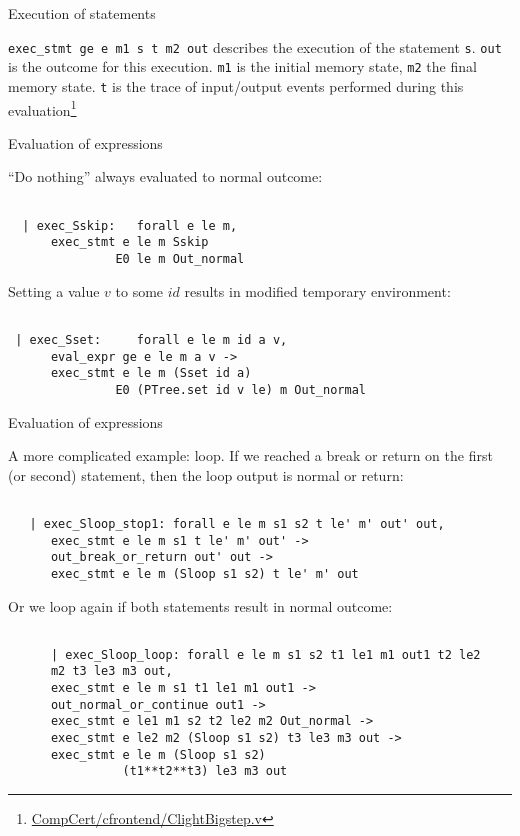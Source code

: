 \documentclass{beamer}
\begin{document}
\begin{frame}{Execution of statements}
  
     \texttt{exec\_stmt ge e m1 s t m2 out} describes the execution of
  the statement \texttt{s}.  \texttt{out} is the outcome for this execution.
  \texttt{m1} is the initial memory state, \texttt{m2} the final memory state.
  \texttt{t} is the trace of input/output events performed during this
  evaluation\footnote{\url{CompCert/cfrontend/ClightBigstep.v}}
\end{frame}

\begin{frame}[fragile]{Evaluation of expressions}

  ``Do nothing'' always evaluated to normal outcome: 

  \begin{lstlisting}[language=Coq]
   
  | exec_Sskip:   forall e le m,
      exec_stmt e le m Sskip
               E0 le m Out_normal
\end{lstlisting}

Setting a value $v$ to some $id$ results in modified temporary environment:
  
    \begin{lstlisting}[language=Coq]
   
 | exec_Sset:     forall e le m id a v,
      eval_expr ge e le m a v ->
      exec_stmt e le m (Sset id a)
               E0 (PTree.set id v le) m Out_normal
\end{lstlisting}
\end{frame}

\begin{frame}[fragile]{Evaluation of expressions}

  A more complicated example: loop. If we reached a break or return on the first (or second) statement, then the loop output is normal or return:
  
  \begin{lstlisting}[language=Coq]
   
   | exec_Sloop_stop1: forall e le m s1 s2 t le' m' out' out,
      exec_stmt e le m s1 t le' m' out' ->
      out_break_or_return out' out ->
      exec_stmt e le m (Sloop s1 s2) t le' m' out
\end{lstlisting}

Or we loop again if both statements result in normal outcome:
  
    \begin{lstlisting}[language=Coq]
   
      | exec_Sloop_loop: forall e le m s1 s2 t1 le1 m1 out1 t2 le2
      m2 t3 le3 m3 out,
      exec_stmt e le m s1 t1 le1 m1 out1 ->
      out_normal_or_continue out1 ->
      exec_stmt e le1 m1 s2 t2 le2 m2 Out_normal ->
      exec_stmt e le2 m2 (Sloop s1 s2) t3 le3 m3 out ->
      exec_stmt e le m (Sloop s1 s2)
                (t1**t2**t3) le3 m3 out
\end{lstlisting}
\end{frame}
\end{document}
